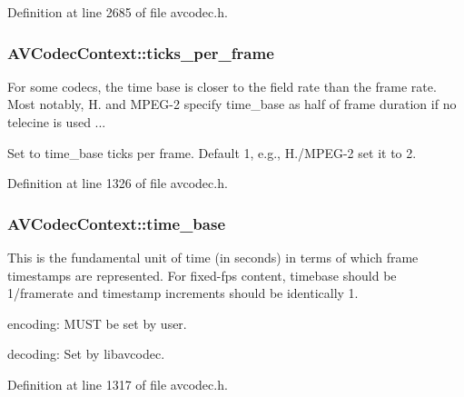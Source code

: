Definition at line 2685 of file avcodec.\+h.

\subsubsection[{\texorpdfstring{ticks\+\_\+per\+\_\+frame}{ticks_per_frame}}]{ A\+V\+Codec\+Context\+::ticks\+\_\+per\+\_\+frame}\hypertarget{struct_a_v_codec_context_a5c62b9c1528a272923ea2a4b86dea31a}{}\label{struct_a_v_codec_context_a5c62b9c1528a272923ea2a4b86dea31a}
For some codecs, the time base is closer to the field rate than the frame rate. Most notably, H. and M\+P\+E\+G-\/2 specify time\+\_\+base as half of frame duration if no telecine is used ...

Set to time\+\_\+base ticks per frame. Default 1, e.\+g., H./\+M\+P\+E\+G-\/2 set it to 2. 

Definition at line 1326 of file avcodec.\+h.

\subsubsection[{\texorpdfstring{time\+\_\+base}{time_base}}]{ A\+V\+Codec\+Context\+::time\+\_\+base}\hypertarget{struct_a_v_codec_context_ab7bfeb9fa5840aac090e2b0bd0ef7589}{}\label{struct_a_v_codec_context_ab7bfeb9fa5840aac090e2b0bd0ef7589}
This is the fundamental unit of time (in seconds) in terms of which frame timestamps are represented. For fixed-\/fps content, timebase should be 1/framerate and timestamp increments should be identically 1.
\begin{DoxyItemize}
\item encoding\+: M\+U\+ST be set by user.
\item decoding\+: Set by libavcodec. 
\end{DoxyItemize}

Definition at line 1317 of file avcodec.\+h.


